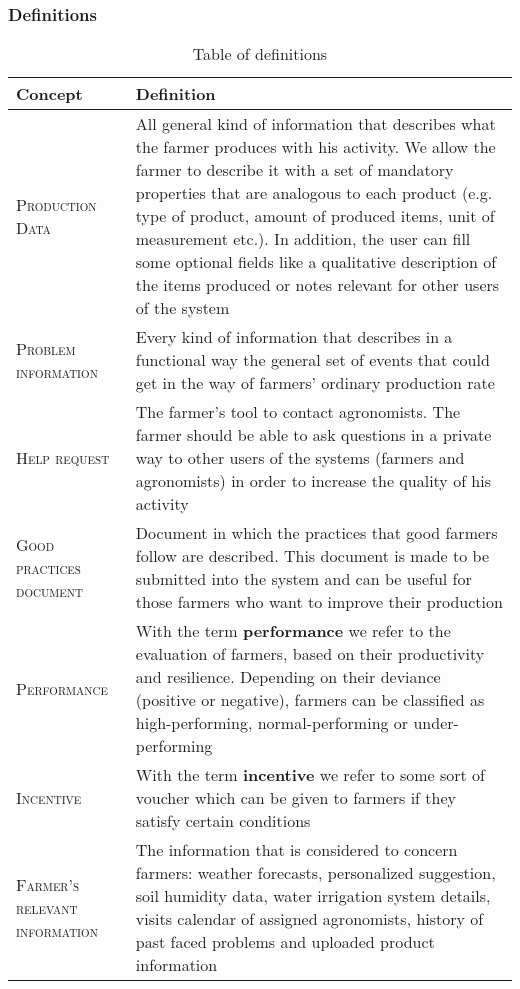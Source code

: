 \subsubsection{Definitions}
\label{sec:definitions}
\begin{table}[H]
    \setlength\arrayrulewidth{1pt}
    \centering
    \begin{tabular}{|m{}|m{}|}
        \rowcolor{myblue}
        \hline
        \color{white}Concept & \color{white}Definition \\
        \hline
        \textsc{Production Data}     &   All general kind of information that describes what the farmer produces with his activity. We allow the farmer to describe it with a set of mandatory properties that are analogous to each product (e.g. type of product, amount of produced items, unit of measurement etc.). In addition, the user can fill some optional fields like a qualitative description of the items produced or notes relevant for other users of the system \\
        \hline
        \textsc{Problem information}  &   Every kind of information that describes in a functional way the general set of events that could get in the way of farmers' ordinary production rate \\
        \hline
        \textsc{Help request}     &   The farmer's tool to contact agronomists. The farmer should be able to ask questions in a private way to other users of the systems (farmers and agronomists) in order to increase the quality of his activity \\
        \hline
        \textsc{\nohyphens{Good  practices document}}     &   Document in which the practices that good farmers follow are described. This document is made to be submitted into the system and can be useful for those farmers who want to improve their production \\
        \hline
        \textsc{Performance}     &   With the term \textbf{performance} we refer to the evaluation of farmers, based on their productivity and resilience. Depending on their deviance (positive or negative), farmers can be classified as high-performing, normal-performing or under-performing \\
        \hline
        \textsc{Incentive}  &   With the term \textbf{incentive} we refer to some sort of voucher which can be given to farmers if they satisfy certain conditions \\
        \hline
        \textsc{Farmer's relevant information}  &   The information that is considered to concern farmers: weather forecasts, personalized suggestion, soil humidity data, water irrigation system details, visits calendar of assigned agronomists, history of past faced problems and uploaded product information \\
        \hline
    \end{tabular}
    
    \caption{\label{tab:def}Table of definitions}
    
\end{table}

